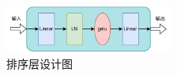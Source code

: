 \begin{figure}[htb]
    \centering
    \includegraphics[width=0.49\textwidth]{排序层设计图.pdf}
    \caption{排序层设计图}
    \label{fig:排序层设计图}
\end{figure}